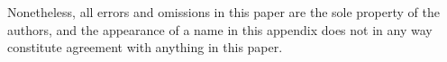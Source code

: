 \documentclass[10]{article}
\begin{document}
Nonetheless, all errors and omissions in this paper are the sole property
of the authors, and the appearance of a name in this appendix does
not in any way constitute agreement with anything in this paper.




\end{document}
